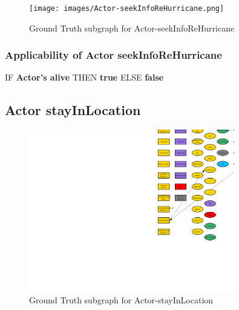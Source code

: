 \documentclass{article}%
\begin{document}
\begin{figure}[ht]%
\centering%
\texttt{[image: images/Actor-seekInfoReHurricane.png]}%
\caption{Ground Truth subgraph for Actor{-}seekInfoReHurricane}%
\end{figure}

%
\subsubsection{Applicability of Actor seekInfoReHurricane}%
\label{ssubsec:Applicability of Actor seekInfoReHurricane}%
\begin{flushleft}%
IF %
\textbf{Actor's alive}%
\linebreak%
\hspace*{2em}%
THEN %
\textbf{true}%
\linebreak%
\hspace*{2em}%
ELSE %
\textbf{false}%
\end{flushleft}

%
\subsection{Actor stayInLocation}%
\label{subsec:Actor stayInLocation}%


\begin{figure}[ht]%
\centering%
\includegraphics[width=0.8\textwidth]{images/Actor-stayInLocation.png}%
\caption{Ground Truth subgraph for Actor{-}stayInLocation}%
\end{figure}

%
\end{document}
